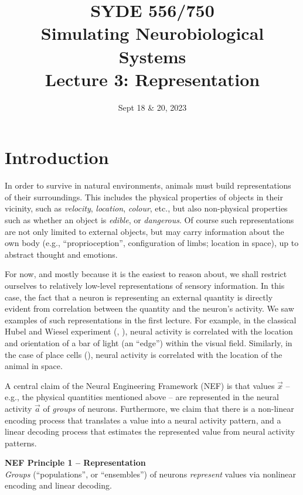 \documentclass[10pt,letterpaper,oneside]{article}
\date{Sept 18 \& 20, 2023}
\title{SYDE 556/750 \\ Simulating Neurobiological Systems \\ Lecture 3: Representation}
\begin{document}

\section{Introduction}


In order to survive in natural environments, animals must build representations of their surroundings. This includes the physical properties of objects in their vicinity, such as \emph{velocity}, \emph{location}, \emph{colour}, etc., but also non-physical properties such as whether an object is \emph{edible}, or \emph{dangerous}. Of course such representations are not only limited to external objects, but may carry information about the own body (e.g., \enquote{proprioception}, configuration of limbs; location in space), up to abstract thought and emotions.

For now, and mostly because it is the easiest to reason about, we shall restrict ourselves to relatively low-level representations of sensory information. In this case, the fact that a neuron is representing an external quantity is directly evident from correlation between the quantity and the neuron's activity.  We saw examples of such representations in the first lecture. For example, in the classical Hubel and Wiesel experiment (, \cite{hubel1959receptive}), neural activity is correlated with the location and orientation of a bar of light (an \enquote{edge}) within the visual field. Similarly, in the case of place cells (), neural activity is correlated with the location of the animal in space.

A central claim of the Neural Engineering Framework (NEF) is that values $\vec x$ -- e.g., the physical quantities mentioned above -- are represented in the neural activity $\vec a$ of \emph{groups} of neurons. Furthermore, we claim that there is a non-linear encoding process that translates a value into a neural activity pattern, and a linear decoding process that estimates the represented value from neural activity patterns.

\begin{mdframed}
\textbf{NEF Principle 1 -- Representation}\\
\emph{Groups} (\enquote{populations}, or \enquote{ensembles}) of neurons \emph{represent} values via nonlinear encoding and linear decoding.
\end{mdframed}
\end{document}
